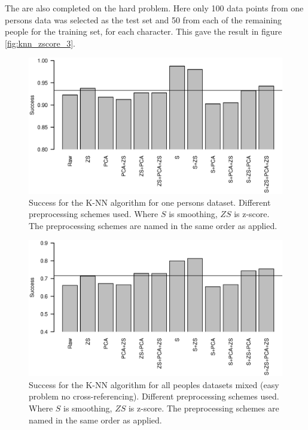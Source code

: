 The are also completed on the hard problem.
Here only 100 data points from one persons data was selected as the test set and 50 from each of the remaining people for the training set, for each character.
This gave the result in figure \ref{fig:knn_zscore_3}.


\begin{figure}[H]
\includegraphics[width = 0.95 \textwidth]{graphics/knn_zscore_1}
\caption{Success for the K-NN algorithm for one persons dataset. Different preprocessing schemes used.
Where $S$ is smoothing, $ZS$ is z-score.
The preprocessing schemes are named in the same order as applied.}
\label{fig:knn_zscore_1}
\end{figure}

\begin{figure}[H]
\includegraphics[width = 0.95 \textwidth]{graphics/knn_zscore_2}
\caption{Success for the K-NN algorithm for all peoples datasets mixed (easy problem no cross-referencing). Different preprocessing schemes used.
Where $S$ is smoothing, $ZS$ is z-score.
The preprocessing schemes are named in the same order as applied.}
\label{fig:knn_zscore_2}
\end{figure}

